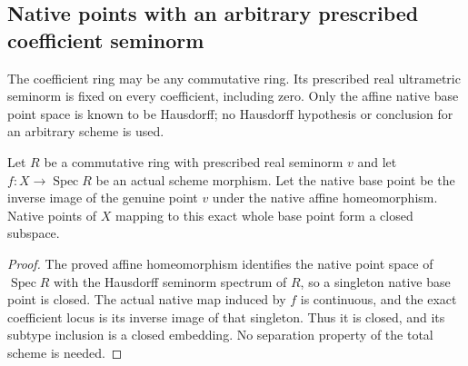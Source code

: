 \subsection{Native points with an arbitrary prescribed coefficient seminorm}
\label{subsec:relative-native-points}

The coefficient ring may be any commutative ring. Its prescribed real
ultrametric seminorm is fixed on every coefficient, including zero.
Only the affine native base point space is known to be Hausdorff; no
Hausdorff hypothesis or conclusion for an arbitrary scheme is used.

\begin{theorem}
\label{scheme:relative-valued-points}
\leanok
{}
Let $R$ be a commutative ring with prescribed real seminorm $v$ and let
$f:X\to\operatorname{Spec}R$ be an actual scheme morphism. Let the native
base point be the inverse image of the genuine point $v$ under the native
affine homeomorphism. Native points of $X$ mapping to this exact whole base
point form a closed subspace.
\end{theorem}
\begin{proof}
The proved affine homeomorphism identifies the native point space of
$\operatorname{Spec}R$ with the Hausdorff seminorm spectrum of $R$, so a
singleton native base point is closed. The actual native map induced by
$f$ is continuous, and the exact coefficient locus is its inverse image
of that singleton. Thus it is closed, and its subtype inclusion is a
closed embedding. No separation property of the total scheme is needed.
\end{proof}

